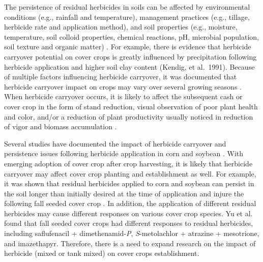 \documentclass[agriculture,article,submit,moreauthors,pdftex]{mdpi}
\begin{document}
The persistence of residual herbicides in soils can be affected by
environmental conditions (e.g., rainfall and temperature), management
practices (e.g., tillage, herbicide rate and application method), and
soil properties (e.g., moisture, temperature, soil colloid properties,
chemical reactions, pH, microbial population, soil texture and organic
matter) \citep{krausz_total_1998-1}. For example, there is evidence that
herbicide carryover potential on cover crops is greatly influenced by
precipitation following herbicide application
\citep{cornelius_carryover_2017-1} and higher soil clay content (Kendig,
et al.~1991). Because of multiple factors influencing herbicide
carryover, it was documented that herbicide carryover impact on crops
may vary over several growing seasons
\citep{cornelius_carryover_2017-1}. When herbicide carryover occurs, it
is likely to affect the subsequent cash or cover crop in the form of
stand reduction, visual observation of poor plant health and color,
and/or a reduction of plant productivity usually noticed in reduction of
vigor and biomass accumulation \citep{marchesan_carryover_2010}.

Several studies have documented the impact of herbicide carryover and
persistence issues following herbicide application in corn and soybean
\citep{ahrens_carryover_1990, alister_efficacy_2005, barnes_injury_1991, curran_corn_1991, horowitz_evaluation_1969, loux_effect_1993}.
With emerging adoption of cover crop after crop harvesting, it is likely
that herbicide carryover may affect cover crop planting and
establishment as well. For example, it was shown that residual
herbicides applied to corn and soybean can persist in the soil longer
than initially desired at the time of application and injure the
following fall seeded cover crop
\citep{cornelius_carryover_2017-1, yu_response_2015}. In addition, the
application of different residual herbicides may cause different
responses on various cover crop species. Yu et
al.~\citep{yu_response_2015} found that fall seeded cover crops had
different responses to residual herbicides, including saflufenacil +
dimethenamid-\emph{P}, \emph{S}-metolachlor + atrazine + mesotrione, and
imazethapyr. Therefore, there is a need to expand research on the impact
of herbicide (mixed or tank mixed) on cover crops establishment.
\end{document}
